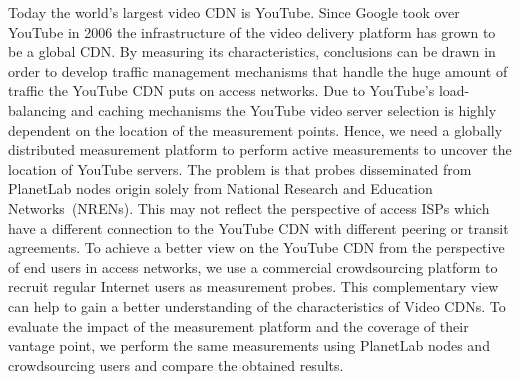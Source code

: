 Today the world's largest video CDN is YouTube.
Since Google took over YouTube in 2006 the infrastructure of the video delivery platform has grown to be a global CDN.
By measuring its characteristics, conclusions can be drawn in order to develop traffic management mechanisms that handle the huge amount of traffic the YouTube CDN puts on access networks.
Due to YouTube's load-balancing and caching mechanisms the YouTube video server selection is highly dependent on the location of the measurement points.
Hence, we need a globally distributed measurement platform to perform active measurements to uncover the location of YouTube servers.
The problem is that probes disseminated from PlanetLab nodes origin solely from National Research and Education Networks~(NRENs). This may not reflect the perspective of access ISPs which have a different connection to the YouTube CDN with different peering or transit agreements.
To achieve a better view on the YouTube CDN from the perspective of end users in access networks, we use a commercial crowdsourcing platform to recruit regular Internet users as measurement probes.
This complementary view can help to gain a better understanding of the characteristics of Video CDNs.
To evaluate the impact of the measurement platform and the coverage of their vantage point, we perform the same measurements using PlanetLab nodes and crowdsourcing users and compare the obtained results.


